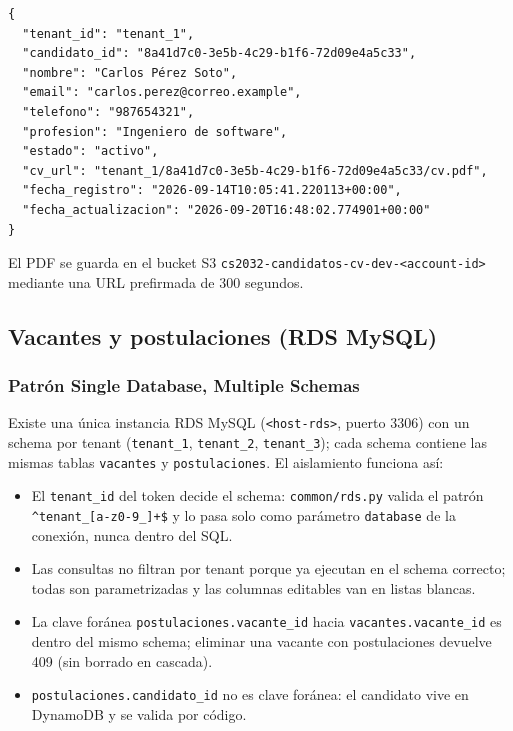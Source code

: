 \begin{lstlisting}
{
  "tenant_id": "tenant_1",
  "candidato_id": "8a41d7c0-3e5b-4c29-b1f6-72d09e4a5c33",
  "nombre": "Carlos Pérez Soto",
  "email": "carlos.perez@correo.example",
  "telefono": "987654321",
  "profesion": "Ingeniero de software",
  "estado": "activo",
  "cv_url": "tenant_1/8a41d7c0-3e5b-4c29-b1f6-72d09e4a5c33/cv.pdf",
  "fecha_registro": "2026-09-14T10:05:41.220113+00:00",
  "fecha_actualizacion": "2026-09-20T16:48:02.774901+00:00"
}
\end{lstlisting}

El PDF se guarda en el bucket S3 \texttt{cs2032-\allowbreak{}candidatos-\allowbreak{}cv-\allowbreak{}dev-\allowbreak{}\textless{}account-\allowbreak{}id\textgreater{}} mediante una URL prefirmada de 300 segundos.

\subsection{Vacantes y postulaciones (RDS MySQL)}
\subsubsection{Patrón Single Database, Multiple Schemas}
Existe una única instancia RDS MySQL (\texttt{\textless{}host-\allowbreak{}rds\textgreater{}}, puerto 3306) con un schema por tenant (\texttt{tenant\_\allowbreak{}1}, \texttt{tenant\_\allowbreak{}2}, \texttt{tenant\_\allowbreak{}3}); cada schema contiene las mismas tablas \texttt{vacantes} y \texttt{postulaciones}. El aislamiento funciona así:
\begin{itemize}
\item El \texttt{tenant\_\allowbreak{}id} del token decide el schema: \texttt{common/rds.py} valida el patrón \texttt{\^{}tenant\_\allowbreak{}[a-\allowbreak{}z0-\allowbreak{}9\_\allowbreak{}]+\$} y lo pasa solo como parámetro \texttt{database} de la conexión, nunca dentro del SQL.
\item Las consultas no filtran por tenant porque ya ejecutan en el schema correcto; todas son parametrizadas y las columnas editables van en listas blancas.
\item La clave foránea \texttt{postulaciones.vacante\_\allowbreak{}id} hacia \texttt{vacantes.vacante\_\allowbreak{}id} es dentro del mismo schema; eliminar una vacante con postulaciones devuelve 409 (sin borrado en cascada).
\item \texttt{postulaciones.candidato\_\allowbreak{}id} no es clave foránea: el candidato vive en DynamoDB y se valida por código.
\end{itemize}

